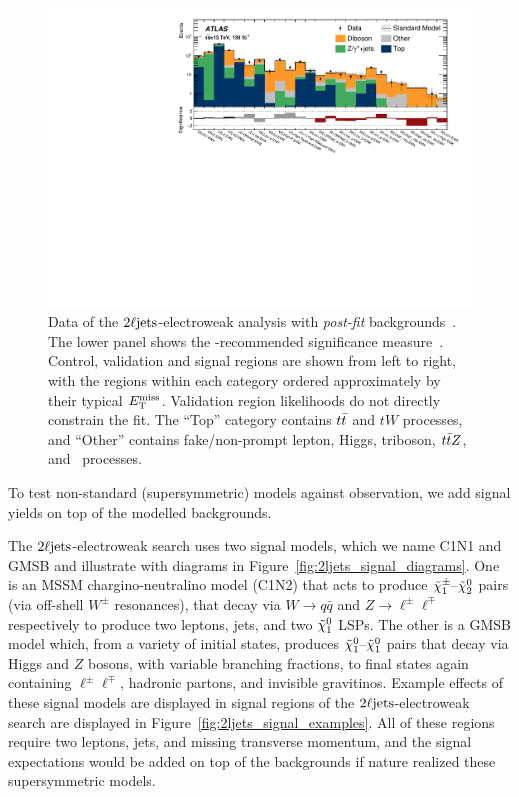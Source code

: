 \begin{figure}[tp]
\centering
\includegraphics[width=\textwidth]{figures/2ljets_summary_log.pdf}
\caption[
Data of the $\twoljets$-electroweak analysis with \emph{post-fit}
backgrounds
]{%
Data of the $\twoljets$-electroweak analysis with \emph{post-fit}
backgrounds~\cite{atlas2022searches}.
The lower panel shows the \atlas-recommended significance
measure~\cite{atlas_significance}.
Control, validation and signal regions are shown from left to right, with the
regions within each category ordered approximately by their typical $E_\mathrm{T}^\mathrm{miss}$.
Validation region likelihoods do not directly constrain the fit.
The ``Top'' category contains $t\bar t$ and $tW$ processes, and
``Other'' contains fake/non-prompt lepton, Higgs, triboson, $t\bar t Z$, and
\topother\ processes.%
}
\label{fig:2ljets_summary}
\end{figure}

To test non-standard (supersymmetric) models against observation,
we add signal yields on top of the modelled backgrounds.

The $\twoljets$-electroweak search uses two signal models,
which we name C1N1 and GMSB and illustrate with diagrams in
Figure~\ref{fig:2ljets_signal_diagrams}.
One is an MSSM chargino-neutralino model (C1N2) that acts to produce
$\tilde\chi^\pm_1\textrm{--}\tilde\chi^0_2$ pairs (via off-shell $W^\pm$ resonances),
that decay via $W\to q\bar q$ and $Z\to \ell^\pm \ell^\mp$
respectively to produce two leptons, jets, and two $\tilde\chi^0_1$ LSPs.
The other is a GMSB model which, from a variety of initial states, produces
$\tilde\chi^0_1\textrm{--}\tilde\chi^0_1$ pairs that decay via Higgs and $Z$
bosons, with variable branching fractions,
to final states again containing $\ell^\pm \ell^\mp$, hadronic partons,
and invisible gravitinos.
Example effects of these signal models are displayed in signal regions of the
$\twoljets$-electroweak search are displayed in
Figure~\ref{fig:2ljets_signal_examples}.
All of these regions require two leptons, jets, and
missing transverse momentum, and the signal expectations would be added on top
of the backgrounds if nature realized these supersymmetric models.

